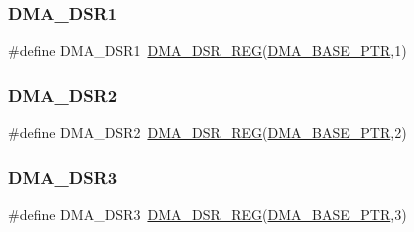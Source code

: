 \subsubsection{\texorpdfstring{D\+M\+A\+\_\+\+D\+S\+R1}{DMA\_DSR1}}
{\footnotesize\ttfamily \#define D\+M\+A\+\_\+\+D\+S\+R1~\hyperlink{group___d_m_a___register___accessor___macros_ga8917566774c0e389162780e01c2dfe57}{D\+M\+A\+\_\+\+D\+S\+R\+\_\+\+R\+EG}(\hyperlink{group___d_m_a___peripheral_ga6997fbc1b1973e9f27170217a3bd6f22}{D\+M\+A\+\_\+\+B\+A\+S\+E\+\_\+\+P\+TR},1)}

\mbox{\label{group___d_m_a___register___accessor___macros_ga3f48036ff3e6ae154d18f0245e63f556}} 
\subsubsection{\texorpdfstring{D\+M\+A\+\_\+\+D\+S\+R2}{DMA\_DSR2}}
{\footnotesize\ttfamily \#define D\+M\+A\+\_\+\+D\+S\+R2~\hyperlink{group___d_m_a___register___accessor___macros_ga8917566774c0e389162780e01c2dfe57}{D\+M\+A\+\_\+\+D\+S\+R\+\_\+\+R\+EG}(\hyperlink{group___d_m_a___peripheral_ga6997fbc1b1973e9f27170217a3bd6f22}{D\+M\+A\+\_\+\+B\+A\+S\+E\+\_\+\+P\+TR},2)}

\mbox{\label{group___d_m_a___register___accessor___macros_ga71f2bebcd1d3ce5e547f4ffd28107c6e}} 
\subsubsection{\texorpdfstring{D\+M\+A\+\_\+\+D\+S\+R3}{DMA\_DSR3}}
{\footnotesize\ttfamily \#define D\+M\+A\+\_\+\+D\+S\+R3~\hyperlink{group___d_m_a___register___accessor___macros_ga8917566774c0e389162780e01c2dfe57}{D\+M\+A\+\_\+\+D\+S\+R\+\_\+\+R\+EG}(\hyperlink{group___d_m_a___peripheral_ga6997fbc1b1973e9f27170217a3bd6f22}{D\+M\+A\+\_\+\+B\+A\+S\+E\+\_\+\+P\+TR},3)}

